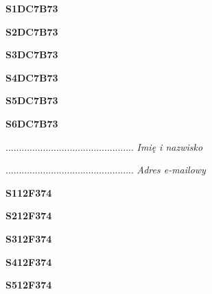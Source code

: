 \begin{turn}{90}\huge \textbf{S1DC7B73}\end{turn}

\begin{turn}{90}\huge \textbf{S2DC7B73}\end{turn}

\begin{turn}{90}\huge \textbf{S3DC7B73}\end{turn}

\begin{turn}{90}\huge \textbf{S4DC7B73}\end{turn}

\begin{turn}{90}\huge \textbf{S5DC7B73}\end{turn}

\begin{turn}{90}\huge \textbf{S6DC7B73}\end{turn}

\begin{turn}{90}\begin{minipage}{\linewidth} \vspace{20mm} ................................................  \textit{Imię i nazwisko}\end{minipage}\end{turn}

\begin{turn}{90}\begin{minipage}{\linewidth} \vspace{20mm} ................................................  \textit{Adres e-mailowy}\end{minipage}\end{turn}

\begin{turn}{90}\huge \textbf{S112F374}\end{turn}

\begin{turn}{90}\huge \textbf{S212F374}\end{turn}

\begin{turn}{90}\huge \textbf{S312F374}\end{turn}

\begin{turn}{90}\huge \textbf{S412F374}\end{turn}

\begin{turn}{90}\huge \textbf{S512F374}\end{turn}

